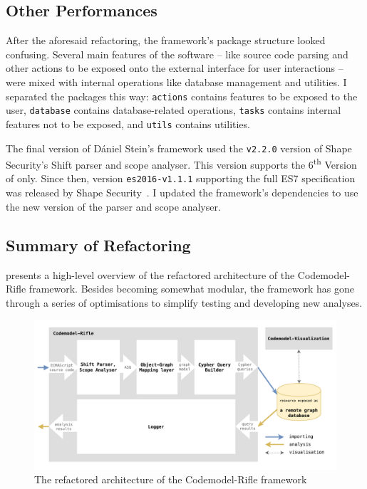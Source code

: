 \subsection{Other Performances}

After the aforesaid refactoring, the framework's package structure looked confusing. Several main features of the software – like source code parsing and other actions to be exposed onto the external interface for user interactions – were mixed with internal operations like database management and utilities. I separated the packages this way: \lstinline{actions} contains features to be exposed to the user, \lstinline{database} contains database-related operations, \lstinline{tasks} contains internal features not to be exposed, and \lstinline{utils} contains utilities.

The final version of Dániel Stein's framework used the \lstinline{v2.2.0} version of Shape Security's Shift parser and scope analyser. This version supports the 6\textsuperscript{th} Version of \es only. Since then, version \lstinline{es2016-v1.1.1} supporting the full ES7 specification was released by Shape Security~\cite{shift-ast, shift-java-github}. I updated the framework's dependencies to use the new version of the parser and scope analyser.

\subsection{Summary of Refactoring}

 presents a high-level overview of the refactored architecture of the Codemodel-Rifle framework. Besides becoming somewhat modular, the framework has gone through a series of optimisations to simplify testing and developing new analyses.

\begin{figure}[!htb]
	\centering
	\includegraphics[width=\textwidth, trim=3mm 3mm 3mm 3mm,clip]{figures/codemodel-rifle-refactored-architecture.pdf}
	\caption{The refactored architecture of the Codemodel-Rifle framework}
	\label{fig:codemodel-rifle-refactored-architecture}
\end{figure}


